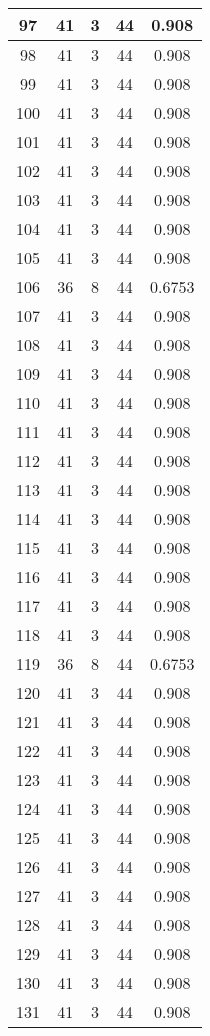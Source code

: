 \documentclass[letterpaper, 12pt]{article}
\begin{document}
\begin{longtable}{|c|c|c|c|c|}
\hline
97 & 41 & 3 & 44 & 0.908 \\
\hline
98 & 41 & 3 & 44 & 0.908 \\
\hline
99 & 41 & 3 & 44 & 0.908 \\
\hline
100 & 41 & 3 & 44 & 0.908 \\
\hline
101 & 41 & 3 & 44 & 0.908 \\
\hline
102 & 41 & 3 & 44 & 0.908 \\
\hline
103 & 41 & 3 & 44 & 0.908 \\
\hline
104 & 41 & 3 & 44 & 0.908 \\
\hline
105 & 41 & 3 & 44 & 0.908 \\
\hline
106 & 36 & 8 & 44 & 0.6753 \\
\hline
107 & 41 & 3 & 44 & 0.908 \\
\hline
108 & 41 & 3 & 44 & 0.908 \\
\hline
109 & 41 & 3 & 44 & 0.908 \\
\hline
110 & 41 & 3 & 44 & 0.908 \\
\hline
111 & 41 & 3 & 44 & 0.908 \\
\hline
112 & 41 & 3 & 44 & 0.908 \\
\hline
113 & 41 & 3 & 44 & 0.908 \\
\hline
114 & 41 & 3 & 44 & 0.908 \\
\hline
115 & 41 & 3 & 44 & 0.908 \\
\hline
116 & 41 & 3 & 44 & 0.908 \\
\hline
117 & 41 & 3 & 44 & 0.908 \\
\hline
118 & 41 & 3 & 44 & 0.908 \\
\hline
119 & 36 & 8 & 44 & 0.6753 \\
\hline
120 & 41 & 3 & 44 & 0.908 \\
\hline
121 & 41 & 3 & 44 & 0.908 \\
\hline
122 & 41 & 3 & 44 & 0.908 \\
\hline
123 & 41 & 3 & 44 & 0.908 \\
\hline
124 & 41 & 3 & 44 & 0.908 \\
\hline
125 & 41 & 3 & 44 & 0.908 \\
\hline
126 & 41 & 3 & 44 & 0.908 \\
\hline
127 & 41 & 3 & 44 & 0.908 \\
\hline
128 & 41 & 3 & 44 & 0.908 \\
\hline
129 & 41 & 3 & 44 & 0.908 \\
\hline
130 & 41 & 3 & 44 & 0.908 \\
\hline
131 & 41 & 3 & 44 & 0.908 \\

\end{longtable}
\end{document}
